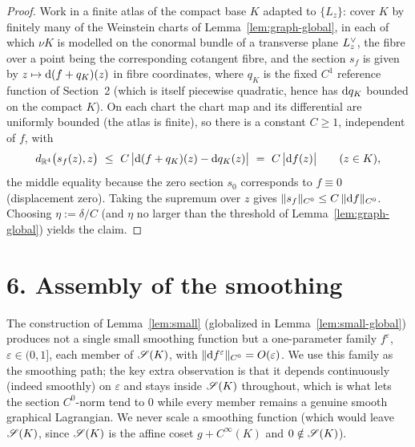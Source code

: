 \begin{proof}
Work in a finite atlas of the compact base $K$ adapted to $\{L_z\}$: cover $K$ by
finitely many of the Weinstein charts of Lemma~\ref{lem:graph-global}, in each of
which $\nu K$ is modelled on the conormal bundle of a transverse plane
$L^{\vee}_z$, the fibre over a point being the corresponding cotangent fibre, and
the section $s_f$ is given by $z\mapsto\mathrm d(f+q_K)(z)$ in fibre coordinates,
where $q_K$ is the fixed $C^1$ reference function of Section~2 (which is itself
piecewise quadratic, hence has $\mathrm d q_K$ bounded on the compact $K$). On each
chart the chart map and its differential are uniformly bounded (the atlas is
finite), so there is a constant $C\ge1$, independent of $f$, with
\[
d_{\qeightR^4}\bigl(s_f(z),z\bigr)\ \le\ C\,\bigl|\qeightdd(f+q_K)(z)-\qeightdd q_K(z)\bigr|
\ =\ C\,\bigl|\qeightdd f(z)\bigr|\qquad(z\in K),
\]
the middle equality because the zero section $s_0$ corresponds to $f\equiv0$
(displacement zero). Taking the supremum over $z$ gives
$\|s_f\|_{C^0}\le C\,\|\mathrm d f\|_{C^0}$. Choosing $\eta:=\delta/C$ (and
$\eta$ no larger than the threshold of Lemma~\ref{lem:graph-global}) yields the
claim.
\end{proof}

\section*{6. Assembly of the smoothing}

The construction of Lemma~\ref{lem:small} (globalized in Lemma~\ref{lem:small-global})
produces not a single small smoothing function but a one-parameter family
$f^\varepsilon$, $\varepsilon\in(0,1]$, each member of $\mathscr S(K)$, with
$\|\mathrm d f^\varepsilon\|_{C^0}=O(\varepsilon)$. We use this family as the smoothing
path; the key extra observation is that it depends continuously (indeed smoothly)
on $\varepsilon$ and stays inside $\mathscr S(K)$ throughout, which is what lets the
section $C^0$-norm tend to $0$ while every member remains a genuine smooth
graphical Lagrangian. We never scale a smoothing function (which would leave
$\mathscr S(K)$, since $\mathscr S(K)$ is the affine coset $g+C^\infty(K)$ and $0\notin\mathscr S(K)$).

